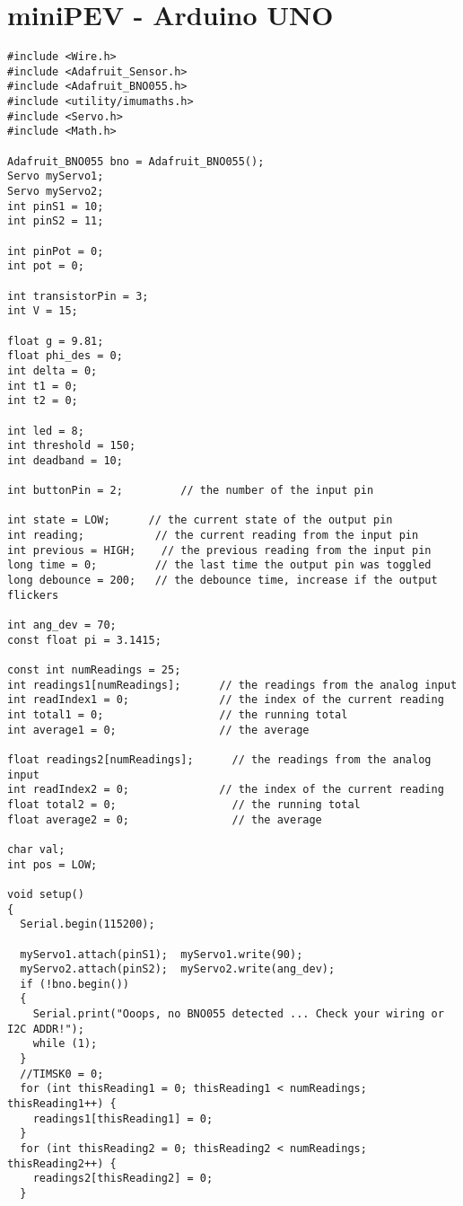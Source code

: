 \section{miniPEV - Arduino UNO}
\begin{lstlisting}[style=codearduino]
#include <Wire.h>
#include <Adafruit_Sensor.h>
#include <Adafruit_BNO055.h>
#include <utility/imumaths.h>
#include <Servo.h>
#include <Math.h>

Adafruit_BNO055 bno = Adafruit_BNO055();
Servo myServo1;
Servo myServo2;
int pinS1 = 10;
int pinS2 = 11;

int pinPot = 0;
int pot = 0;

int transistorPin = 3;
int V = 15;

float g = 9.81;
float phi_des = 0;
int delta = 0;
int t1 = 0;
int t2 = 0;

int led = 8;
int threshold = 150;
int deadband = 10;

int buttonPin = 2;         // the number of the input pin

int state = LOW;      // the current state of the output pin
int reading;           // the current reading from the input pin
int previous = HIGH;    // the previous reading from the input pin
long time = 0;         // the last time the output pin was toggled
long debounce = 200;   // the debounce time, increase if the output flickers

int ang_dev = 70;
const float pi = 3.1415;

const int numReadings = 25;
int readings1[numReadings];      // the readings from the analog input
int readIndex1 = 0;              // the index of the current reading
int total1 = 0;                  // the running total
int average1 = 0;                // the average

float readings2[numReadings];      // the readings from the analog input
int readIndex2 = 0;              // the index of the current reading
float total2 = 0;                  // the running total
float average2 = 0;                // the average

char val;
int pos = LOW;

void setup()
{
  Serial.begin(115200);

  myServo1.attach(pinS1);  myServo1.write(90);
  myServo2.attach(pinS2);  myServo2.write(ang_dev);
  if (!bno.begin())
  {
    Serial.print("Ooops, no BNO055 detected ... Check your wiring or I2C ADDR!");
    while (1);
  }
  //TIMSK0 = 0;
  for (int thisReading1 = 0; thisReading1 < numReadings; thisReading1++) {
    readings1[thisReading1] = 0;
  }
  for (int thisReading2 = 0; thisReading2 < numReadings; thisReading2++) {
    readings2[thisReading2] = 0;
  }


\end{lstlisting}
